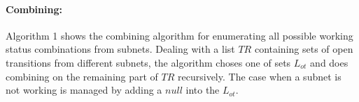 \documentclass{lncs/llncs}
\begin{document}

%
%

\paragraph{Combining:}
Algorithm 1 shows the combining algorithm for enumerating all possible
working status combinations from subnets. Dealing with a list $TR$
containing  sets of open transitions from different subnets,
the algorithm choses one of sets $L_{ot}$ and does combining on the
remaining part of $TR$ recursively. The case when a subnet is not working is
managed by adding a $null$ into the $L_{ot}$.
\end{document}
